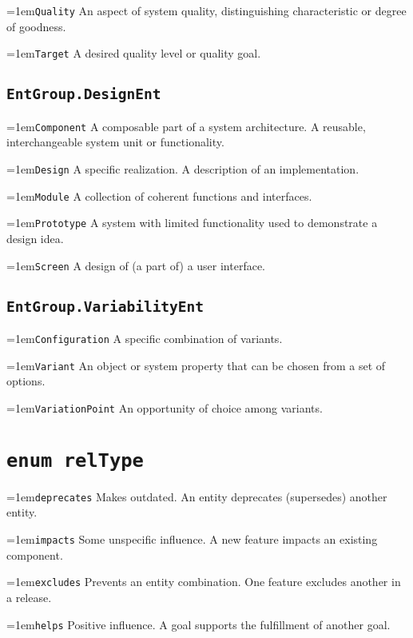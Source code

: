 \documentclass[a4paper,oneside]{article}
\begin{document}
\begin{multicols*}{4}
\hangindent=1em\lstinline+Quality+ An aspect of system quality, distinguishing characteristic or degree of goodness. 

\hangindent=1em\lstinline+Target+ A desired quality level or quality goal. 


\subsection*{\texttt{EntGroup.DesignEnt}}
\hangindent=1em\lstinline+Component+ A composable part of a system architecture. A reusable, interchangeable system unit or functionality. 

\hangindent=1em\lstinline+Design+ A specific realization. A description of an implementation. 

\hangindent=1em\lstinline+Module+ A collection of coherent functions and interfaces. 

\hangindent=1em\lstinline+Prototype+ A system with limited functionality used to demonstrate a design idea. 

\hangindent=1em\lstinline+Screen+ A design of (a part of) a user interface. 


\subsection*{\texttt{EntGroup.VariabilityEnt}}
\hangindent=1em\lstinline+Configuration+ A specific combination of variants. 

\hangindent=1em\lstinline+Variant+ An object or system property that can be chosen from a set of options. 

\hangindent=1em\lstinline+VariationPoint+ An opportunity of choice among variants. 



\section*{\texttt{enum relType}}
\hangindent=1em\lstinline+deprecates+ Makes outdated. An entity deprecates (supersedes) another entity. 

\hangindent=1em\lstinline+impacts+ Some unspecific influence. A new feature impacts an existing component. 

\hangindent=1em\lstinline+excludes+ Prevents an entity combination. One feature excludes another in a release. 

\hangindent=1em\lstinline+helps+ Positive influence. A goal supports the fulfillment of another goal. 


\end{multicols*}
\end{document}
